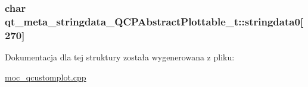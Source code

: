 \subsubsection[{\texorpdfstring{stringdata0}{stringdata0}}]{\setlength{\rightskip}{0pt plus 5cm}char qt\+\_\+meta\+\_\+stringdata\+\_\+\+Q\+C\+P\+Abstract\+Plottable\+\_\+t\+::stringdata0\mbox{[}270\mbox{]}}\hypertarget{structqt__meta__stringdata___q_c_p_abstract_plottable__t_a397cb51ceb93b62e1fb7a828768255e4}{}\label{structqt__meta__stringdata___q_c_p_abstract_plottable__t_a397cb51ceb93b62e1fb7a828768255e4}


Dokumentacja dla tej struktury została wygenerowana z pliku\+:\begin{DoxyCompactItemize}
\item 
\hyperlink{moc__qcustomplot_8cpp}{moc\+\_\+qcustomplot.\+cpp}\end{DoxyCompactItemize}
